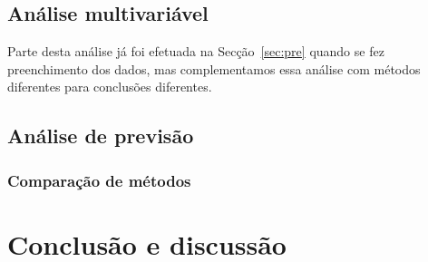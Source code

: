 \documentclass[10pt, conference, compsocconf]{IEEEtran}
\begin{document}
\subsection{Análise multivariável}
Parte desta análise já foi efetuada na Secção~\ref{sec:pre} quando se
fez preenchimento dos dados, mas complementamos essa análise com
métodos diferentes para conclusões diferentes.


\subsection{Análise de previsão}

\lipsum[4]


\subsubsection{Comparação de métodos}

\lipsum[5]


\section{Conclusão e discussão}
\label{sec:cnd}

\lipsum[4]
\cite{boser1992training}

\small
\begin{spacing}{0.92}


\end{spacing}
\end{document}
